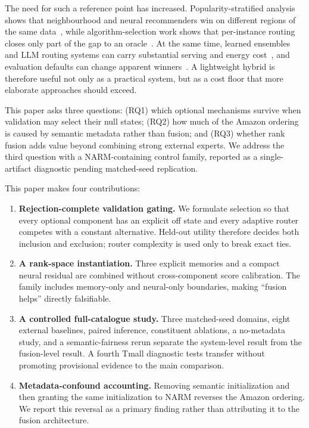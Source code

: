 \documentclass[runningheads]{llncs}
\begin{document}
The need for such a reference point has increased. Popularity-stratified
analysis shows that neighbourhood and neural recommenders win on different
regions of the same data~\cite{popstrat2025}, while algorithm-selection work
shows that per-instance routing closes only part of the gap to an
oracle~\cite{algselect2025}. At the same time, learned ensembles and LLM
routing systems can carry substantial serving and energy cost~\cite{flame2026,dynamicllm2026,energy2026,green2025}, and evaluation defaults can
change apparent winners~\cite{defaults2025,seqsplit2026}. A lightweight hybrid
is therefore useful not only as a practical system, but as a cost floor that
more elaborate approaches should exceed.

This paper asks three questions: (RQ1) which optional mechanisms survive when
validation may select their null states; (RQ2) how much of the Amazon ordering
is caused by semantic metadata rather than fusion; and (RQ3) whether rank
fusion adds value beyond combining strong external experts. We address the
third question with a NARM-containing control family, reported as a
single-artifact diagnostic pending matched-seed replication.

This paper makes four contributions:

\begin{enumerate}
\item \textbf{Rejection-complete validation gating.} We formulate selection
      so that every optional component has an explicit off state and every
      adaptive router competes with a constant alternative. Held-out utility
      therefore decides both inclusion and exclusion; router complexity is
      used only to break exact ties.
\item \textbf{A rank-space instantiation.} Three explicit memories and a
      compact neural residual are combined without cross-component score
      calibration. The family includes memory-only and neural-only boundaries,
      making ``fusion helps'' directly falsifiable.
\item \textbf{A controlled full-catalogue study.} Three matched-seed domains,
      eight external baselines, paired inference, constituent ablations, a
      no-metadata study, and a semantic-fairness rerun separate the system-level
      result from the fusion-level result. A fourth Tmall diagnostic tests
      transfer without promoting provisional evidence to the main comparison.
\item \textbf{Metadata-confound accounting.} Removing semantic initialization
      and then granting the same initialization to NARM reverses the Amazon
      ordering. We report this reversal as a primary finding rather than
      attributing it to the fusion architecture.
\end{enumerate}
\end{document}
